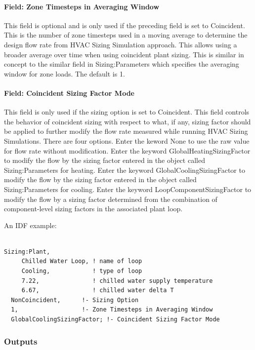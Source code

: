 \paragraph{Field: Zone Timesteps in Averaging Window}\label{field-zone-timesteps-in-averaging-window}

This field is optional and is only used if the preceding field is set to Coincident. This is the number of zone timesteps used in a moving average to determine the design flow rate from HVAC Sizing Simulation approach. This allows using a broader average over time when using coincident plant sizing. This is similar in concept to the similar field in Sizing:Parameters which specifies the averaging window for zone loads. The default is 1.

\paragraph{Field: Coincident Sizing Factor Mode}\label{field-coincident-sizing-factor-mode}

This field is only used if the sizing option is set to Coincident. This field controls the behavior of coincident sizing with respect to what, if any, sizing factor should be applied to further modify the flow rate measured while running HVAC Sizing Simulations. There are four options. Enter the keword None to use the raw value for flow rate without modification. Enter the keyword GlobalHeatingSizingFactor to modify the flow by the sizing factor entered in the object called Sizing:Parameters for heating. Enter the keyword GlobalCoolingSizingFactor to modify the flow by the sizing factor entered in the object called Sizing:Parameters for cooling. Enter the keyword LoopComponentSizingFactor to modify the flow by a sizing factor determined from the combination of component-level sizing factors in the associated plant loop.

An IDF example:

\begin{lstlisting}

Sizing:Plant,
     Chilled Water Loop, ! name of loop
     Cooling,            ! type of loop
     7.22,               ! chilled water supply temperature
     6.67,               ! chilled water delta T
  NonCoincident,      !- Sizing Option
  1,                  !- Zone Timesteps in Averaging Window
  GlobalCoolingSizingFactor; !- Coincident Sizing Factor Mode
\end{lstlisting}

\subsubsection{Outputs}\label{outputs-3-004}

